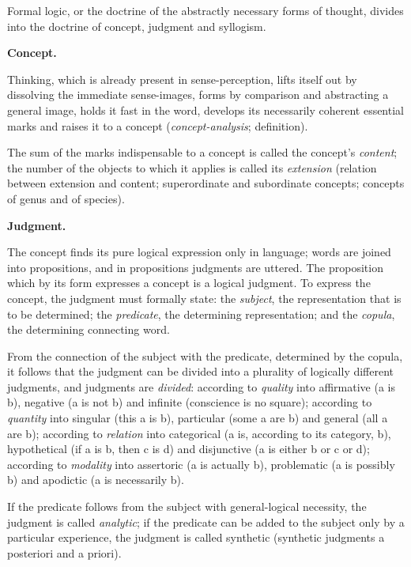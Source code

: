 \documentclass[12pt,a4paper,openany]{book}
\newcommand{\opage}[1]{\marginnote{\footnotesize\textit{[#1]}}}
\begin{document}
Formal logic, or the doctrine of the abstractly necessary forms of thought, divides into the doctrine of concept,
judgment and syllogism.

\begin{center}\textbf{Concept.}\end{center}

Thinking, which is already present in sense-perception, lifts itself out by dissolving the immediate sense-images,
forms by comparison and abstracting a general image, holds it fast in the word, develops its necessarily coherent
essential marks and raises it to a concept (\emph{concept-analysis}; definition).

The sum of the marks indispensable to a concept is called the concept's \emph{content}; the number of the objects to
which it applies is called its \emph{extension} (relation between extension and content; superordinate and
subordinate concepts; concepts of genus and of species).

\begin{center}\textbf{Judgment.}\end{center}

The concept finds its pure logical expression only in language; words are joined into propositions, and in
propositions judgments are uttered. The proposition which by its form expresses a concept is a logical judgment. To
express the concept, the judgment must formally state: the \emph{subject}, the representation that is to be
determined; the \emph{predicate}, the determining representation; and the \emph{copula}, the determining connecting
word.

From the connection of the subject with the predicate, determined by the copula, it follows that the judgment can be
divided into a plurality of logically different %
\opage{3}judgments, and judgments are \emph{divided}: according to \emph{quality} into affirmative (a is b), negative
(a is not b) and infinite (conscience is no square); according to \emph{quantity} into singular (this a is b),
particular (some a are b) and general (all a are b); according to \emph{relation} into categorical (a is, according
to its category, b), hypothetical (if a is b, then c is d) and disjunctive (a is either b or c or d); according to
\emph{modality} into assertoric (a is actually b), problematic (a is possibly b) and apodictic (a is necessarily b).

If the predicate follows from the subject with general-logical necessity, the judgment is called \emph{analytic}; if
the predicate can be added to the subject only by a particular experience, the judgment is called synthetic
(synthetic judgments a posteriori and a priori).
\end{document}
